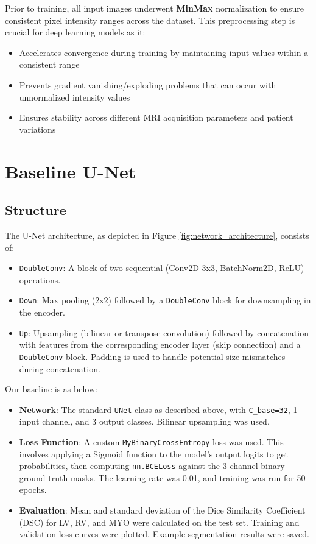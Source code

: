 \documentclass{article}
\begin{document}
Prior to training, all input images underwent \textbf{MinMax} normalization to ensure consistent pixel intensity ranges across the dataset. This preprocessing step is crucial for deep learning models as it:
\begin{itemize}
  \item Accelerates convergence during training by maintaining input values within a consistent range
  \item Prevents gradient vanishing/exploding problems that can occur with unnormalized intensity values
  \item Ensures stability across different MRI acquisition parameters and patient variations
\end{itemize}

\section{Baseline U-Net}

\subsection{Structure}
The U-Net architecture, as depicted in Figure \ref{fig:network_architecture}, consists of:
\begin{itemize}
  \item \texttt{DoubleConv}: A block of two sequential (Conv2D 3x3, BatchNorm2D, ReLU) operations.
  \item \texttt{Down}: Max pooling (2x2) followed by a \texttt{DoubleConv} block for downsampling in the encoder.
  \item \texttt{Up}: Upsampling (bilinear or transpose convolution) followed by concatenation with features from the
        corresponding encoder layer (skip connection) and a \texttt{DoubleConv} block. Padding is used to handle potential
        size mismatches during concatenation.
\end{itemize}

Our baseline is as below:
\begin{itemize}
  \item \textbf{Network}: The standard \texttt{UNet} class as described above, with \texttt{C\_base=32}, 1 input channel,
        and 3 output classes. Bilinear upsampling was used.
  \item \textbf{Loss Function}: A custom \texttt{MyBinaryCrossEntropy} loss was used. This involves applying a Sigmoid
        function to the model's output logits to get probabilities, then computing \texttt{nn.BCELoss} against the 3-channel
        binary ground truth masks. The learning rate was 0.01, and training was run for 50 epochs.
  \item \textbf{Evaluation}: Mean and standard deviation of the Dice Similarity Coefficient (DSC) for LV, RV, and MYO
        were calculated on the test set. Training and validation loss curves were plotted.
        Example segmentation results were saved.
\end{itemize}
\end{document}
